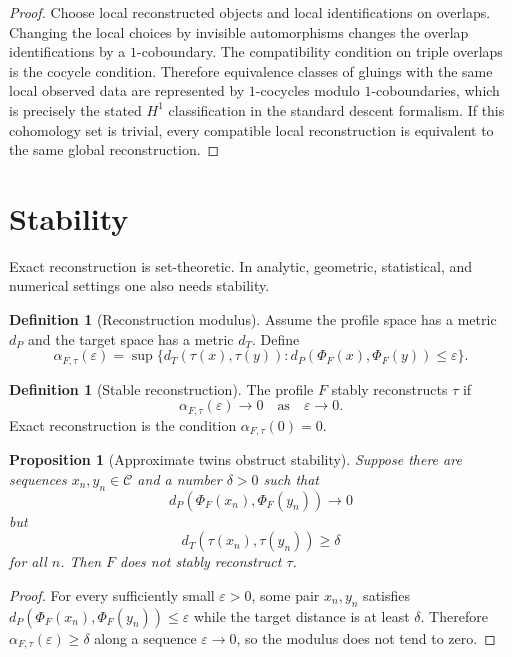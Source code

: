 \documentclass[11pt]{article}
\newtheorem{proposition}[theorem]{Proposition}
\theoremstyle{definition}
\newtheorem{definition}[theorem]{Definition}
\theoremstyle{remark}
\begin{document}
\begin{proof}
Choose local reconstructed objects and local identifications on overlaps.  Changing the local choices by invisible automorphisms changes the overlap identifications by a \(1\)-coboundary.  The compatibility condition on triple overlaps is the cocycle condition.  Therefore equivalence classes of gluings with the same local observed data are represented by \(1\)-cocycles modulo \(1\)-coboundaries, which is precisely the stated \(H^1\) classification in the standard descent formalism.  If this cohomology set is trivial, every compatible local reconstruction is equivalent to the same global reconstruction.
\end{proof}

\section{Stability}

Exact reconstruction is set-theoretic.  In analytic, geometric, statistical, and numerical settings one also needs stability.

\begin{definition}[Reconstruction modulus]
Assume the profile space has a metric \(d_P\) and the target space has a metric \(d_T\).  Define
\[
\alpha_{F,\tau}(\varepsilon)
=
\sup\{d_T(\tau(x),\tau(y)):
d_P(\Phi_F(x),\Phi_F(y))\leq\varepsilon\}.
\]
\end{definition}

\begin{definition}[Stable reconstruction]
The profile \(F\) stably reconstructs \(\tau\) if
\[
\alpha_{F,\tau}(\varepsilon)\to 0
\quad\text{as}\quad \varepsilon\to 0.
\]
Exact reconstruction is the condition \(\alpha_{F,\tau}(0)=0\).
\end{definition}

\begin{proposition}[Approximate twins obstruct stability]
Suppose there are sequences \(x_n,y_n\in\mathcal C\) and a number \(\delta>0\) such that
\[
d_P(\Phi_F(x_n),\Phi_F(y_n))\to 0
\]
but
\[
d_T(\tau(x_n),\tau(y_n))\geq\delta
\]
for all \(n\).  Then \(F\) does not stably reconstruct \(\tau\).
\end{proposition}

\begin{proof}
For every sufficiently small \(\varepsilon>0\), some pair \(x_n,y_n\) satisfies \(d_P(\Phi_F(x_n),\Phi_F(y_n))\leq\varepsilon\) while the target distance is at least \(\delta\).  Therefore \(\alpha_{F,\tau}(\varepsilon)\geq\delta\) along a sequence \(\varepsilon\to0\), so the modulus does not tend to zero.
\end{proof}
\end{document}
